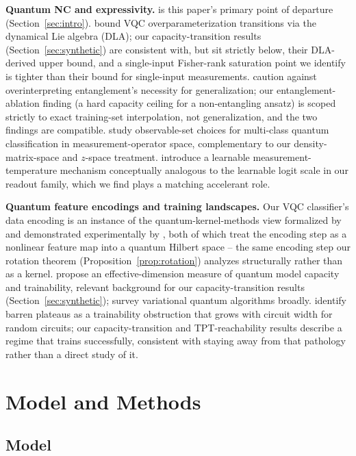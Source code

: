 \documentclass[pdflatex,sn-mathphys-ay]{sn-jnl}
\theoremstyle{thmstyleone}
\theoremstyle{thmstyletwo}
\begin{document}
\textbf{Quantum NC and expressivity.} \citet{du2023} is this paper's primary point of departure (Section~\ref{sec:intro}). \citet{larocca2023} bound VQC overparameterization transitions via the dynamical Lie algebra (DLA); our capacity-transition results (Section~\ref{sec:synthetic}) are consistent with, but sit strictly below, their DLA-derived upper bound, and a single-input Fisher-rank saturation point we identify is tighter than their bound for single-input measurements. \citet{bowles2024} caution against overinterpreting entanglement's necessity for generalization; our entanglement-ablation finding (a hard capacity ceiling for a non-entangling ansatz) is scoped strictly to exact training-set interpolation, not generalization, and the two findings are compatible. \citet{sansebastian2026} study observable-set choices for multi-class quantum classification in measurement-operator space, complementary to our density-matrix-space and $z$-space treatment. \citet{mondal2026} introduce a learnable measurement-temperature mechanism conceptually analogous to the learnable logit scale in our readout family, which we find plays a matching accelerant role.

\textbf{Quantum feature encodings and training landscapes.} Our VQC classifier's data encoding is an instance of the quantum-kernel-methods view formalized by \citet{schuld2019} and demonstrated experimentally by \citet{havlicek2019}, both of which treat the encoding step as a nonlinear feature map into a quantum Hilbert space -- the same encoding step our rotation theorem (Proposition~\ref{prop:rotation}) analyzes structurally rather than as a kernel. \citet{abbas2021} propose an effective-dimension measure of quantum model capacity and trainability, relevant background for our capacity-transition results (Section~\ref{sec:synthetic}); \citet{cerezo2021} survey variational quantum algorithms broadly. \citet{mcclean2018} identify barren plateaus as a trainability obstruction that grows with circuit width for random circuits; our capacity-transition and TPT-reachability results describe a regime that trains successfully, consistent with staying away from that pathology rather than a direct study of it.

\section{Model and Methods}
\label{sec:methods}

\subsection{Model}
\label{sec:model}
\end{document}
